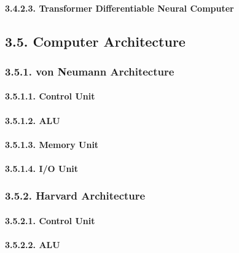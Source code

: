 \documentclass[]{article}
\let\oldparagraph\paragraph
\renewcommand{\paragraph}[1]{\oldparagraph{#1}\mbox{}}
\begin{document}
\paragraph{3.4.2.3. Transformer Differentiable Neural
Computer}\label{transformer-differentiable-neural-computer}

\subsection{3.5. Computer Architecture}\label{computer-architecture}

\subsubsection{3.5.1. von Neumann
Architecture}\label{von-neumann-architecture}

\paragraph{3.5.1.1. Control Unit}\label{control-unit}

\paragraph{3.5.1.2. ALU}\label{alu}

\paragraph{3.5.1.3. Memory Unit}\label{memory-unit}

\paragraph{3.5.1.4. I/O Unit}\label{io-unit}

\subsubsection{3.5.2. Harvard Architecture}\label{harvard-architecture}

\paragraph{3.5.2.1. Control Unit}\label{control-unit-1}

\paragraph{3.5.2.2. ALU}\label{alu-1}
\end{document}
